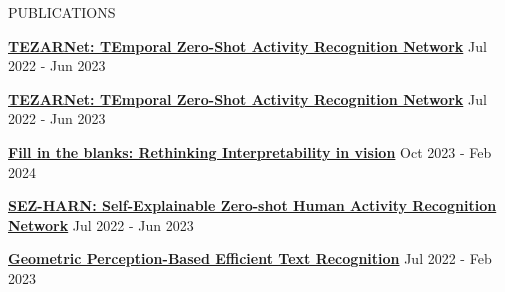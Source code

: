 \documentclass{resume} %
\begin{document}

\begin{rSection}{PUBLICATIONS}
\vspace{-1.25em}
\item \textbf{\href{https://link.springer.com/chapter/10.1007/978-981-99-8184-7_34}{TEZARNet: TEmporal Zero-Shot Activity Recognition Network}} \hfill Jul 2022 - Jun 2023
\item \textbf{\href{https://link.springer.com/chapter/10.1007/978-981-99-8184-7_34}{TEZARNet: TEmporal Zero-Shot Activity Recognition Network}} \hfill Jul 2022 - Jun 2023
\item \textbf{\href{https://arxiv.org/abs/2411.10273}{Fill in the blanks: Rethinking Interpretability in vision}} \hfill Oct 2023 - Feb 2024
\item \textbf{\href{https://arxiv.org/abs/2507.00050}{SEZ-HARN: Self-Explainable Zero-shot Human Activity Recognition Network}} \hfill Jul 2022 - Jun 2023
\item \textbf{\href{https://arxiv.org/abs/2302.03873}{Geometric Perception-Based Efficient Text Recognition}} \hfill Jul 2022 - Feb 2023
\end{rSection} 
\newpage
\end{document}
